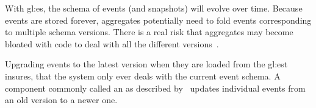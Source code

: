 With \gls{gl:es}, the schema of events (and snapshots) will evolve over time. Because events are stored forever, aggregates potentially need to fold events corresponding to multiple schema versions. There is a real risk that aggregates may become
bloated with code to deal with all the different versions~\citep{richardson2018microservices}. 

Upgrading events to the latest version when they are loaded from the \gls{gl:est} insures, that the system only ever deals with the current event schema. A component commonly called an  as described by~\citep{richardson2018microservices} updates individual events from an old version to a newer one.



